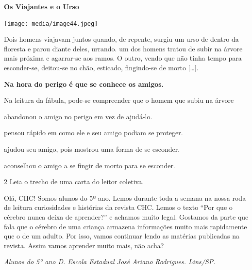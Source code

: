 \begin{myquote}
\textbf{Os Viajantes e o Urso}

\begin{center}
\texttt{[image: media/image44.jpeg]}
\end{center}

Dois homens viajavam juntos quando, de repente, surgiu um urso de dentro
da floresta e parou diante deles, urrando. um dos homens tratou de subir
na árvore mais próxima e agarrar-se aos ramos. O outro, vendo que não
tinha tempo para esconder-se, deitou-se no chão, esticado, fingindo-se de
morto {[}\ldots{}{]}.

\textbf{Na hora do perigo é que se conhece os amigos.}

\end{myquote}

Na leitura da fábula, pode-se compreender que o homem que subiu na árvore

\begin{escolha}
\item abandonou o amigo no perigo em vez de ajudá-lo.

\item pensou rápido em como ele e seu amigo podiam se proteger.

\item ajudou seu amigo, pois mostrou uma forma de se esconder.

\item aconselhou o amigo a se fingir de morto para se esconder.
\end{escolha}
\pagebreak

\num{2} Leia o trecho de uma carta do leitor coletiva.

\begin{myquote}
\textit{}

Olá, CHC! Somos alunos do 5º ano. Lemos durante toda a semana na nossa
roda de leitura curiosidades e histórias da revista CHC. Lemos o texto
``Por que o cérebro nunca deixa de aprender?'' e achamos muito legal.
Gostamos da parte que fala que o cérebro de uma criança armazena
informações muito mais rapidamente que o de um adulto. Por isso, vamos
continuar lendo as matérias publicadas na revista. Assim vamos aprender
muito mais, não acha?

\begin{flushleft}
\textit{Alunos do 5º ano D. Escola Estadual José Ariano Rodrigues. Lins/SP.}
\end{flushleft}

\end{myquote}

